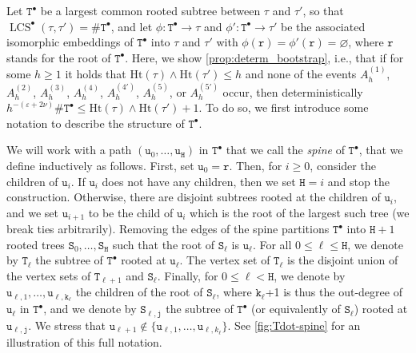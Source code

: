 \documentclass[11pt,reqno]{amsart}
\newcommand{\1}{\mathbf{1}}
\newcommand{\0}{\mathbf{0}}
\newcommand{\ttS}{\mathtt{S}}
\newcommand{\ttT}{\mathtt{T}}
\newcommand{\ttH}{\mathtt{H}}
\newcommand{\ttj}{\mathtt{j}}
\newcommand{\ttk}{\mathtt{k}}
\newcommand{\ttr}{\mathtt{r}}
\newcommand{\ttu}{\mathtt{u}}
\newcommand{\Ht}{\mathrm{Ht}}
\newcommand{\LCS}{\operatorname{LCS}}
\newcommand{\eps}{\varepsilon}
\renewcommand{\emptyset}{\varnothing}
\begin{document}
Let $\ttT^\bullet$ be a largest common rooted subtree between $\tau$ and $\tau'$, so that $\LCS^\bullet(\tau,\tau')=\#\ttT^\bullet$, and let $\phi:\ttT^\bullet\rightarrow \tau$ and $\phi':\ttT^\bullet\rightarrow \tau'$ be the associated isomorphic embeddings of $\ttT^\bullet$ into $\tau$ and $\tau'$ with $\phi(\ttr) = \phi'(\ttr) = \emptyset$, where $\ttr$ stands for the root of $\ttT^\bullet$. Here, we show \cref{prop:determ_bootstrap}, i.e., that if for some $h\geq 1$ it holds that $\Ht(\tau)\wedge\Ht(\tau')\leq h$ and none of the events $A_h^{(1)}$, $A_h^{(2)}$, $A_h^{(3)}$, $A_h^{(4)}$, $A_h^{(4')}$, $A_h^{(5)}$, or $A_h^{(5')}$ occur, then deterministically $h^{-(\eps+2\nu)}\#\ttT^\bullet \leq \Ht(\tau)\wedge\Ht(\tau')+1$. To do so, we first introduce some notation to describe the structure of $\ttT^\bullet$.

We will work with a path $(\ttu_0,\ldots,\ttu_{\ttH})$ in $\ttT^\bullet$ that we call the \emph{spine} of $\ttT^\bullet$, that we define inductively as follows. First, set $\ttu_0 = \ttr$. Then, for $i \geq 0$, consider the children of $\ttu_i$. If $\ttu_i$ does not have any children, then we set $\ttH = i$ and stop the construction. Otherwise, there are disjoint subtrees rooted at the children of $\ttu_i$, and we set $\ttu_{i+1}$ to be the child of $\ttu_i$ which is the root of the largest such tree (we break ties arbitrarily). Removing the edges of the spine partitions $\ttT^\bullet$ into $\ttH+1$ rooted trees $\ttS_0,\ldots,\ttS_{\ttH}$ such that the root of $\ttS_\ell$ is $\ttu_\ell$. For all $0\leq \ell \leq \ttH$, we denote by $\ttT_\ell$ the subtree of $\ttT^\bullet$ rooted at $\ttu_\ell$. The vertex set of $\ttT_\ell$ is the disjoint union of the vertex sets of $\ttT_{\ell+1}$ and $\ttS_\ell$. Finally, for $0 \le \ell < \ttH$, we denote by $\ttu_{\ell,1},\ldots,\ttu_{\ell,\ttk_\ell}$ the children of the root of $\ttS_\ell$, where $\ttk_\ell$+1 is thus the out-degree of $\ttu_\ell$ in $\ttT^\bullet$, and we denote by $\ttS_{\ell,\ttj}$ the subtree of $\ttT^\bullet$ (or equivalently of $\ttS_\ell$) rooted at $\ttu_{\ell,\ttj}$. We stress that $\ttu_{\ell+1} \notin \{\ttu_{\ell,1},\ldots,\ttu_{\ell,k_\ell}\}$. See \cref{fig:Tdot-spine} for an illustration of this full notation.
\end{document}
